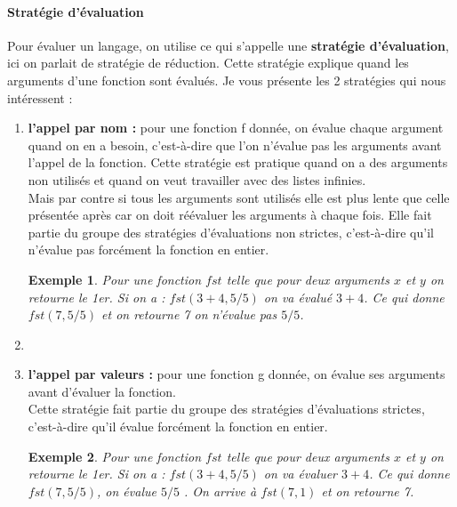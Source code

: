 \documentclass[10pt,a4paper]{report}
\newtheorem{ex}{Exemple}
\begin{document}
	\paragraph{Stratégie d'évaluation} Pour évaluer un langage, on utilise ce qui s'appelle une \textbf{stratégie d'évaluation}, ici on parlait de stratégie de réduction. Cette stratégie explique quand les arguments d'une fonction sont évalués. Je vous présente les 2 stratégies qui nous intéressent :
	\smallbreak
	\begin{enumerate}
		\item \textbf{l'appel par nom :} pour une fonction f donnée, on évalue chaque argument quand on en a besoin, c'est-à-dire que l'on n'évalue pas les arguments avant l'appel de la fonction. Cette stratégie est pratique quand on a des arguments non utilisés et quand on veut travailler avec des listes infinies. 
		\\Mais par contre si tous les arguments sont utilisés elle est plus lente que celle présentée après car on doit réévaluer les arguments à chaque fois. Elle fait partie du groupe des stratégies d'évaluations non strictes, c'est-à-dire qu'il n'évalue pas forcément la fonction en entier. 
		\begin{ex}
			Pour une fonction $fst$ telle que pour deux arguments $x$ et $y$ on retourne le 1er. Si on a : $fst(3+4,5/5)$ on va évalué $3+4$. Ce qui donne $fst(7,5/5)$ et on retourne 7 on n'évalue pas $5/5$.
		\end{ex}
		\item[]
		\item  \textbf{l'appel par valeurs :} pour une fonction g donnée, on évalue ses arguments avant d'évaluer la fonction.
		\\Cette stratégie fait partie du groupe des stratégies d'évaluations strictes, c'est-à-dire qu'il évalue forcément la fonction en entier.
		\begin{ex}
			Pour une fonction $fst$ telle que pour deux arguments $x$ et $y$ on retourne le 1er. Si on a : $fst(3+4,5/5)$ on va évaluer $3+4$. Ce qui donne $fst(7,5/5)$, on évalue $5/5$ . On arrive à $fst(7,1)$ et on retourne 7.
		\end{ex}
	\end{enumerate}
	\medbreak
	
\end{document}
